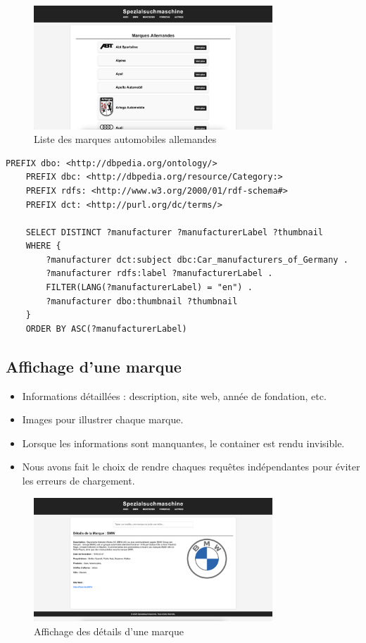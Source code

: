 \documentclass[a4paper]{article}
\begin{document}
\begin{figure}[H]
    \centering
    \includegraphics[width=0.8\textwidth]{images/marques.png}
    \caption{Liste des marques automobiles allemandes}
\end{figure}

\begin{lstlisting}[language=SPARQL, caption=Requête SPARQL pour rechercher toutes les marques allemandes]
    PREFIX dbo: <http://dbpedia.org/ontology/>
    PREFIX dbc: <http://dbpedia.org/resource/Category:>
    PREFIX rdfs: <http://www.w3.org/2000/01/rdf-schema#>
    PREFIX dct: <http://purl.org/dc/terms/>

    SELECT DISTINCT ?manufacturer ?manufacturerLabel ?thumbnail
    WHERE {
        ?manufacturer dct:subject dbc:Car_manufacturers_of_Germany .
        ?manufacturer rdfs:label ?manufacturerLabel .
        FILTER(LANG(?manufacturerLabel) = "en") .
        ?manufacturer dbo:thumbnail ?thumbnail
    }
    ORDER BY ASC(?manufacturerLabel)
\end{lstlisting}

\subsection{Affichage d'une marque}
\begin{itemize}
    \item Informations détaillées : description, site web, année de fondation, etc.
    \item Images pour illustrer chaque marque.
    \item Lorsque les informations sont manquantes, le container est rendu invisible.
    \item Nous avons fait le choix de rendre chaques requêtes indépendantes pour éviter les erreurs de chargement.
\end{itemize}
\begin{figure}[H]
    \centering
    \includegraphics[width=0.8\textwidth]{images/marque.png}
    \caption{Affichage des détails d'une marque}
\end{figure}
\end{document}
